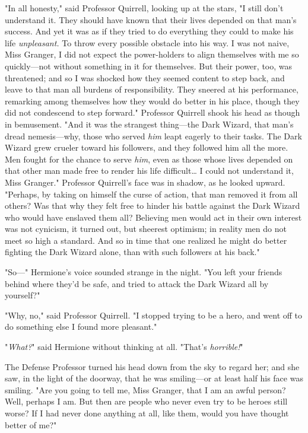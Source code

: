 "In all honesty," said Professor Quirrell, looking up at the stars, "I still
don't understand it. They should have known that their lives depended on that
man's success. And yet it was as if they tried to do everything they could to
make his life \emph{unpleasant.} To throw every possible obstacle into his way.
I was not naive, Miss Granger, I did not expect the power-holders to align
themselves with me so quickly---not without something in it for themselves. But
their power, too, was threatened; and so I was shocked how they seemed content
to step back, and leave to that man all burdens of responsibility. They sneered
at his performance, remarking among themselves how they would do better in his
place, though they did not condescend to step forward." Professor Quirrell
shook his head as though in bemusement. "And it was the strangest thing---the
Dark Wizard, that man's dread nemesis---why, those who served \emph{him} leapt
eagerly to their tasks. The Dark Wizard grew crueler toward his followers, and
they followed him all the more. Men fought for the chance to serve \emph{him},
even as those whose lives depended on that other man made free to render his
life difficult{\ldots} I could not understand it, Miss Granger." Professor
Quirrell's face was in shadow, as he looked upward. "Perhaps, by taking on
himself the curse of action, that man removed it from all others? Was that why
they felt free to hinder his battle against the Dark Wizard who would have
enslaved them all? Believing men would act in their own interest was not
cynicism, it turned out, but sheerest optimism; in reality men do not meet so
high a standard. And so in time that one realized he might do better fighting
the Dark Wizard alone, than with such followers at his back."

"So---" Hermione's voice sounded strange in the night. "You left your friends
behind where they'd be safe, and tried to attack the Dark Wizard all by
yourself?"

"Why, no," said Professor Quirrell. "I stopped trying to be a hero, and went
off to do something else I found more pleasant."

"\emph{What?}" said Hermione without thinking at all. "That's \emph{horrible!}"

The Defense Professor turned his head down from the sky to regard her; and she
saw, in the light of the doorway, that he was smiling---or at least half his
face was smiling. "Are you going to tell me, Miss Granger, that I am an awful
person? Well, perhaps I am. But then are people who never even try to be heroes
still worse? If I had never done anything at all, like them, would you have
thought better of me?"


